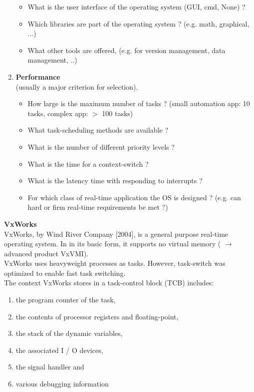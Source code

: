 \begin{enumerate}
\begin{itemize}
	\item What is the user interface of the operating system (GUI, cmd, None) ?
	\item Which libraries are part of the operating system ? (e.g. math, graphical, ...)
	\item What other tools are offered, (e.g. for version management, data management, ..)
\end{itemize}

\item  \textbf{Performance}\\ (usually a major criterion for selection). 
\begin{itemize}
	\item How large is the maximum number of tasks ?   (small automation app: 10 tasks, complex app: $\mathrm{>}$ 100 tasks)
	\item What task-scheduling methods are available ?
	\item What is the number of different priority levels ?
	\item What is the time for a context-switch ?
	\item What is the latency time with responding to interrupts ?
	\item For which class of real-time application the OS is designed ?  (e.g. can hard or firm real-time requirements be met ?)
\end{itemize}
\end{enumerate}

{\rot\bf  VxWorks}\\

VxWorks, by Wind River Company [2004], is a general purpose real-time operating system. In in its basic form, it supports no virtual memory ( $\rightarrow$ advanced product VxVMI).\\

VxWorks uses heavyweight processes as tasks. However, task-switch was optimized to enable fast task switching. \\

The context VxWorks stores in a task-control block (TCB) includes:

\begin{enumerate}
\item  the program counter of the task,

\item  the contents of processor registers and floating-point,

\item  the stack of the dynamic variables,

\item  the associated I / O devices,

\item  the signal handler and

\item  various debugging information
\end{enumerate}

